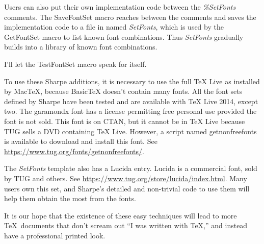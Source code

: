 \documentclass[11pt, oneside]{amsart}
\begin{document}
Users can also put their own implementation code between the  {\em \%SetFonts} comments.
The SaveFontSet macro reaches between the comments and saves the implementation code to a file in  named {\em SetFonts}, which is used by the GetFontSet macro to list known font combinations. Thus {\em SetFonts}  gradually builds into a library of known font combinations.

I'll let the TestFontSet macro speak for itself.

To use these Sharpe additions, it is necessary to use the full TeX Live as installed by MacTeX,
because BasicTeX doesn't contain many fonts. All the font sets defined by Sharpe have been
tested and are available with TeX Live 2014, except two. The garamondx font has a license permitting free personal use provided the font is not sold. This font is on CTAN, but it cannot
be in TeX Live because TUG sells a DVD containing TeX Live. However, a script named getnonfreefonts is available to download and install this font. See \url{https://www.tug.org/fonts/getnonfreefonts/}.

The {\em SetFonts} template also has a Lucida entry. Lucida is a commercial font, sold by TUG and others. 
See \url{https://www.tug.org/store/lucida/index.html}. Many users own this set, and Sharpe's detailed and non-trivial code to use them will help them obtain the most from the fonts.

It is our hope that the existence of these easy techniques will lead to more \TeX\ documents that don't scream out ``I was written with \TeX,'' and instead have a professional printed look.
\end{document}
